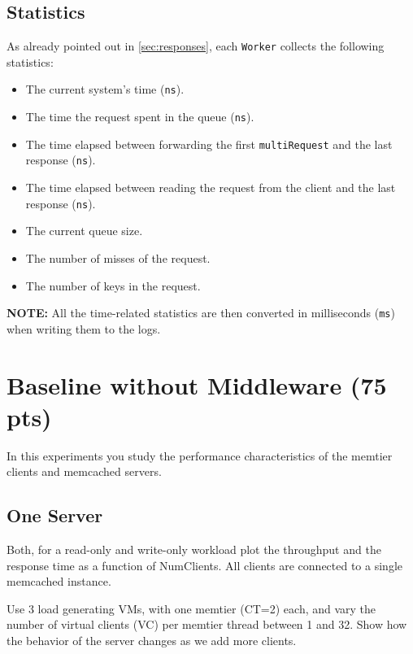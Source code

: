 \documentclass[11pt,a4paper]{article}
\begin{document}
\subsection{Statistics}

As already pointed out in \ref{sec:responses}, each \texttt{Worker} collects the following statistics:

\begin{itemize}
    \item The current system's time (\texttt{ns}).
    \item The time the request spent in the queue (\texttt{ns}).
    \item The time elapsed between forwarding the first \texttt{multiRequest} and the last response (\texttt{ns}).
    \item The time elapsed between reading the request from the client and the last response (\texttt{ns}).
    \item The current queue size.
    \item The number of misses of the request.
    \item The number of keys in the request.
\end{itemize}

\textbf{NOTE:} All the time-related statistics are then converted in milliseconds (\texttt{ms}) when writing them to the logs.

\section{Baseline without Middleware (75 pts)}

In this experiments you study the performance characteristics of the memtier clients and memcached servers.

\subsection{One Server}

Both, for a read-only and write-only workload plot the throughput and the response time as a function of NumClients. All clients are connected to a single memcached instance.

Use 3 load generating VMs, with one memtier (CT=2) each, and vary the number of virtual clients (VC) per memtier thread between 1 and 32. Show how the behavior of the server changes as we add more clients.
\end{document}
